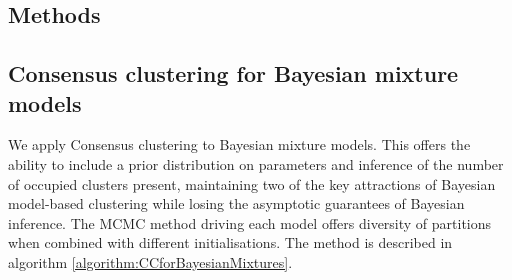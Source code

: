 \documentclass{bioinfo}
\begin{document}


\begin{methods}
\section{Methods}

\subsection{Consensus clustering for Bayesian mixture models}
We apply Consensus clustering to Bayesian mixture models. This offers the ability to include a prior distribution on parameters and inference of the number of occupied clusters present, maintaining two of the key attractions of Bayesian model-based clustering while losing the asymptotic guarantees of Bayesian inference. 
The MCMC method driving each model offers diversity of partitions when combined with different initialisations. The method is described in algorithm \ref{algorithm:CCforBayesianMixtures}.



\end{methods}
\end{document}
